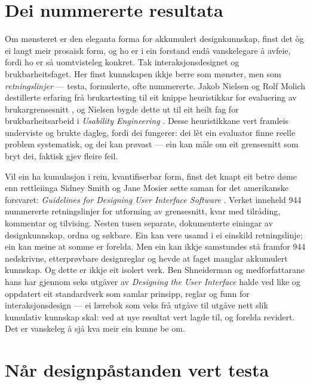 \section{Dei nummererte resultata}

Om mønsteret er den eleganta forma for akkumulert designkunnskap, finst det òg ei langt meir prosaisk form, og ho er i ein forstand endå vanskelegare å avfeie, fordi ho er så uomtvisteleg konkret. Tak interaksjonsdesignet og brukbarheitsfaget. Her finst kunnskapen ikkje berre som mønster, men som \emph{retningslinjer} — testa, formulerte, ofte nummererte. Jakob Nielsen og Rolf Molich destillerte erfaring frå brukartesting til eit knippe heuristikkar for evaluering av brukargrensesnitt \autocite{nielsen1990heuristic}, og Nielsen bygde dette ut til eit heilt fag for brukbarheitsarbeid i \textit{Usability Engineering} \autocite{nielsen1993}. Desse heuristikkane vert framleis underviste og brukte dagleg, fordi dei fungerer: dei lèt ein evaluator finne reelle problem systematisk, og dei kan prøvast — ein kan måle om eit grensesnitt som bryt dei, faktisk gjev fleire feil.

Vil ein ha kumulasjon i rein, kvantifiserbar form, finst det knapt eit betre døme enn rettleiinga Sidney Smith og Jane Mosier sette saman for det amerikanske forsvaret: \textit{Guidelines for Designing User Interface Software} \autocite{smith1986guidelines}. Verket inneheld 944 nummererte retningslinjer for utforming av grensesnitt, kvar med tilråding, kommentar og tilvising. Nesten tusen separate, dokumenterte einingar av designkunnskap, ordna og søkbare. Ein kan vere usamd i ei einskild retningslinje; ein kan meine at somme er forelda. Men ein kan ikkje samstundes stå framfor 944 nedskrivne, etterprøvbare designreglar og hevde at faget manglar akkumulert kunnskap. Og dette er ikkje eit isolert verk. Ben Shneiderman og medforfattarane hans har gjennom seks utgåver av \textit{Designing the User Interface} halde ved like og oppdatert eit standardverk som samlar prinsipp, reglar og funn for interaksjonsdesign \autocite{shneiderman2016ui} — ei lærebok som veks frå utgåve til utgåve nett slik kumulativ kunnskap skal: ved at nye resultat vert lagde til, og forelda revidert. Det er vanskeleg å sjå kva meir ein kunne be om.

\section{Når designpåstanden vert testa}

